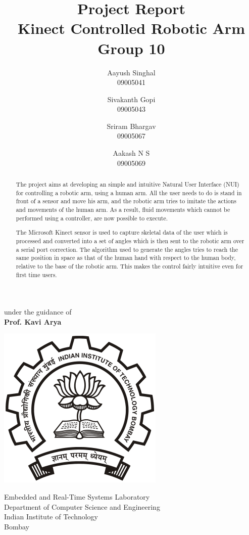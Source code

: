 \documentclass[a4paper,11pt]{article}
\title {Project Report \\ Kinect Controlled Robotic Arm \\ Group 10}
\author {Aayush Singhal\\09005041 \and Sivakanth Gopi\\09005043  \and Sriram Bhargav\\09005067 \and Aakash N S\\09005069}
\begin{document}
\maketitle

\begin{center}
\begin{large}
under the guidance of\\
\textbf{Prof. Kavi Arya}\\
\end{large}
\end{center}
\begin{center}
\includegraphics[scale=0.32]{images/iitb.png}
\end{center}
\begin{center}
\begin{large}
Embedded and Real-Time Systems Laboratory \\
Department of Computer Science and Engineering \\
Indian Institute of Technology \\
Bombay \\
\end{large}
\end{center}

\newpage
\tableofcontents
\newpage

\begin{abstract}
The project aims at developing an simple and intuitive Natural User Interface (NUI) for controlling a robotic arm, using a human arm. All the user needs to do is stand in front of a sensor and move his arm, and the robotic arm tries to imitate the actions and movements of the human arm. As a result, fluid movements which cannot be performed using a controller, are now possible to execute. 

The Microsoft Kinect sensor is used to capture skeletal data of the user which is processed and converted into a set of angles which is then sent to the robotic arm over a serial port correction. The algorithm used to generate the angles tries to reach the same position in space as that of the human hand with respect to the human body, relative to the base of the robotic arm. This makes the control fairly intuitive even for first time users.

\end{abstract}
\end{document}
